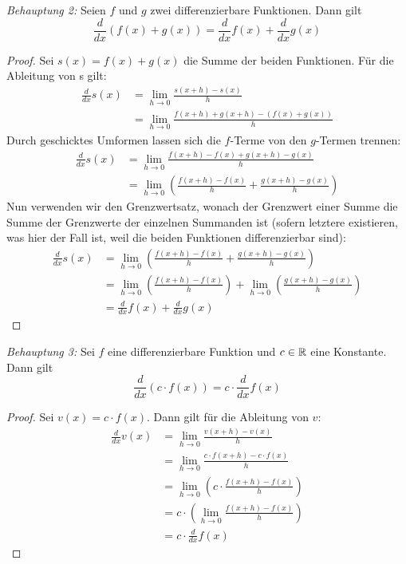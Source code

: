\emph{Behauptung 2:} Seien $f$ und $g$ zwei differenzierbare Funktionen. Dann gilt
$$\frac{d}{dx} \left(f(x)+g(x)\right) = \frac{d}{dx} f(x) + \frac{d}{dx} g(x)$$
\begin{proof}
	Sei $s(x)=f(x)+g(x)$ die Summe der beiden Funktionen. Für die Ableitung von s gilt:
	\begin{align*}
		\frac{d}{dx}s(x) & = \lim_{h\rightarrow0} \frac{s(x+h)-s(x)}{h}               \\
		                 & = \lim_{h\rightarrow0} \frac{f(x+h)+g(x+h)-(f(x)+g(x))}{h}
	\end{align*}
	Durch geschicktes Umformen lassen sich die $f$-Terme von den $g$-Termen trennen:
	\begin{align*}
		\frac{d}{dx} s(x) & = \lim_{h\rightarrow0} \frac{f(x+h)-f(x) +g(x+h)-g(x)}{h}                       \\
		                  & = \lim_{h\rightarrow0}\left(\frac{f(x+h)-f(x)}{h} +\frac{g(x+h)-g(x)}{h}\right)
	\end{align*}
	Nun verwenden wir den Grenzwertsatz, wonach der Grenzwert einer Summe die Summe der Grenzwerte der einzelnen Summanden ist (sofern letztere existieren, was hier der Fall ist, weil die beiden Funktionen differenzierbar sind):
	\begin{align*}
		\frac{d}{dx} s(x) & =\lim_{h\rightarrow0}\left(\frac{f(x+h)-f(x)}{h} +\frac{g(x+h)-g(x)}{h}\right)                                    \\
		                  & = \lim_{h\rightarrow0}\left(\frac{f(x+h)-f(x)}{h}\right) + \lim_{h\rightarrow0}\left(\frac{g(x+h)-g(x)}{h}\right) \\
		                  & = \frac{d}{dx} f(x) + \frac{d}{dx} g(x)
	\end{align*}
\end{proof}
\emph{Behauptung 3:} Sei $f$ eine differenzierbare Funktion und $c\in \mathbb{R}$ eine Konstante. Dann gilt
$$\frac{d}{dx}\left(c\cdot f(x)\right) = c\cdot \frac{d}{dx} f(x)$$
\begin{proof}
	Sei $v(x) = c\cdot f(x)$. Dann gilt für die Ableitung von $v$:
	\begin{align*}
		\frac{d}{dx} v(x) & =\lim_{h\rightarrow0} \frac{v(x+h)-v(x)}{h}                       \\
		                  & = \lim_{h\rightarrow0} \frac{c\cdot f(x+h)-c\cdot f(x)}{h}        \\
		                  & =\lim_{h\rightarrow0} \left( c\cdot \frac{f(x+h)-f(x)}{h} \right) \\
		                  & = c\cdot \left(\lim_{h\rightarrow0} \frac{f(x+h)-f(x)}{h}\right)  \\
		                  & = c\cdot \frac{d}{dx}f(x)
	\end{align*}
\end{proof}
